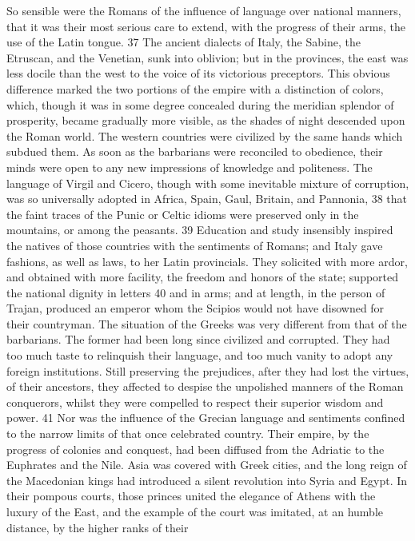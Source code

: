 So sensible were the Romans of the influence of language over
national manners, that it was their most serious care to extend,
with the progress of their arms, the use of the Latin tongue. 37
The ancient dialects of Italy, the Sabine, the Etruscan, and the
Venetian, sunk into oblivion; but in the provinces, the east was
less docile than the west to the voice of its victorious
preceptors. This obvious difference marked the two portions of
the empire with a distinction of colors, which, though it was in
some degree concealed during the meridian splendor of prosperity,
became gradually more visible, as the shades of night descended
upon the Roman world. The western countries were civilized by the
same hands which subdued them. As soon as the barbarians were
reconciled to obedience, their minds were open to any new
impressions of knowledge and politeness. The language of Virgil
and Cicero, though with some inevitable mixture of corruption,
was so universally adopted in Africa, Spain, Gaul, Britain, and
Pannonia, 38 that the faint traces of the Punic or Celtic idioms
were preserved only in the mountains, or among the peasants. 39
Education and study insensibly inspired the natives of those
countries with the sentiments of Romans; and Italy gave fashions,
as well as laws, to her Latin provincials. They solicited with
more ardor, and obtained with more facility, the freedom and
honors of the state; supported the national dignity in letters 40
and in arms; and at length, in the person of Trajan, produced an
emperor whom the Scipios would not have disowned for their
countryman. The situation of the Greeks was very different from
that of the barbarians. The former had been long since civilized
and corrupted. They had too much taste to relinquish their
language, and too much vanity to adopt any foreign institutions.
Still preserving the prejudices, after they had lost the virtues,
of their ancestors, they affected to despise the unpolished
manners of the Roman conquerors, whilst they were compelled to
respect their superior wisdom and power. 41 Nor was the influence
of the Grecian language and sentiments confined to the narrow
limits of that once celebrated country. Their empire, by the
progress of colonies and conquest, had been diffused from the
Adriatic to the Euphrates and the Nile. Asia was covered with
Greek cities, and the long reign of the Macedonian kings had
introduced a silent revolution into Syria and Egypt. In their
pompous courts, those princes united the elegance of Athens with
the luxury of the East, and the example of the court was
imitated, at an humble distance, by the higher ranks of their
